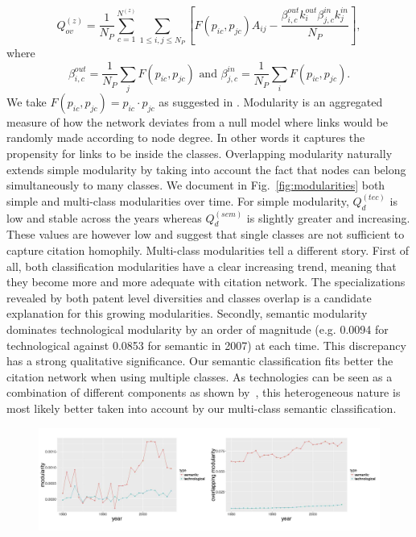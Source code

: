 \[
\displaystyle Q_{ov}^{(z)} = \frac{1}{N_P} \sum_{c = 1}^{N^{(z)}} \sum_{1\leq i,j \leq N_P}\left[F(p_{ic},p_{jc})A_{ij} - \frac{\beta_{i,c}^{out}k_i^{out}\beta_{j,c}^{in}k_j^{in}}{N_P}\right],
\]
where
\[
 \beta_{i,c}^{out} =   \frac{1}{N_P} \displaystyle \sum_j F(p_{ic},p_{jc}) \text{ and } \beta_{j,c}^{in} =  \frac{1}{N_P} \displaystyle \sum_i F(p_{ic},p_{jc}).
\]
We take $F(p_{ic},p_{jc}) = p_{ic}\cdot p_{jc}$ as suggested in \cite{nicosia2009extending}. Modularity is an aggregated measure of how the network deviates from a null model where links would be randomly made according to node degree. In other words it captures the propensity for links to be inside the classes. Overlapping modularity naturally extends simple modularity by taking into account the fact that nodes can belong simultaneously to many classes.
We document in Fig.~\ref{fig:modularities} both simple and multi-class modularities over time. For simple modularity, $Q_d^{(tec)}$ is low and stable across the years whereas $Q_d^{(sem)}$ is slightly greater and increasing. These values are however low and suggest that single classes are not sufficient to capture citation homophily. Multi-class modularities tell a different story. First of all, both classification modularities have a clear increasing trend, meaning that they become more and more adequate with citation network. The specializations revealed by both patent level diversities and classes overlap is a candidate explanation for this growing modularities. Secondly, semantic modularity dominates technological modularity by an order of magnitude (e.g. 0.0094 for technological against 0.0853 for semantic in 2007) at each time. This discrepancy has a strong qualitative significance. Our semantic classification fits better the citation network when using multiple classes. As technologies can be seen as a combination of different components as shown by~\cite{Youn:2015fk}, this heterogeneous nature is most likely better taken into account by our multi-class semantic classification.

\begin{figure}[!ht]
\centering
\includegraphics[width=\linewidth]{Figures/Final/C-patentsmining-modularities.jpg}
\label{fig:patentsmining:modularities}
\end{figure}



